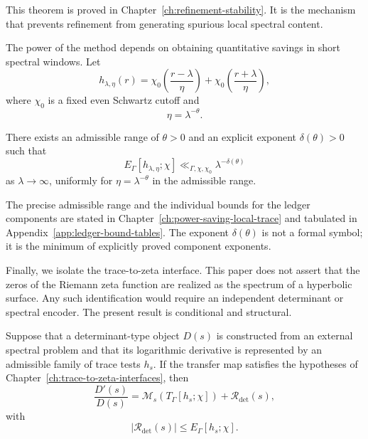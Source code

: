 This theorem is proved in Chapter~\ref{ch:refinement-stability}.  It is the mechanism that prevents refinement from generating spurious local spectral content.

The power of the method depends on obtaining quantitative savings in short spectral windows.  Let
\begin{equation}
  h_{\lambda,\eta}(r)
  =
  \chi_0\left(\frac{r-\lambda}{\eta}\right)
  +
  \chi_0\left(\frac{r+\lambda}{\eta}\right),
  \label{eq:intro-window-multiplier}
\end{equation}
where \(\chi_0\) is a fixed even Schwartz cutoff and
\begin{equation}
  \eta=\lambda^{-\theta}.
  \label{eq:intro-window-width}
\end{equation}

\begin{theorem}
\label{thm:intro-power-saving}
There exists an admissible range of \(\theta>0\) and an explicit exponent \(\delta(\theta)>0\) such that
\begin{equation}
  E_\Gamma[h_{\lambda,\eta};\chi]
  \ll_{\Gamma,\chi,\chi_0}
  \lambda^{-\delta(\theta)}
  \label{eq:intro-power-saving-ledger}
\end{equation}
as \(\lambda\to\infty\), uniformly for \(\eta=\lambda^{-\theta}\) in the admissible range.
\end{theorem}

The precise admissible range and the individual bounds for the ledger components are stated in Chapter~\ref{ch:power-saving-local-trace} and tabulated in Appendix~\ref{app:ledger-bound-tables}.  The exponent \(\delta(\theta)\) is not a formal symbol; it is the minimum of explicitly proved component exponents.

Finally, we isolate the trace-to-zeta interface.  This paper does not assert that the zeros of the Riemann zeta function are realized as the spectrum of a hyperbolic surface.  Any such identification would require an independent determinant or spectral encoder.  The present result is conditional and structural.

\begin{theorem}
\label{thm:intro-trace-to-determinant}
Suppose that a determinant-type object \(D(s)\) is constructed from an external spectral problem and that its logarithmic derivative is represented by an admissible family of trace tests \(h_s\).  If the transfer map satisfies the hypotheses of Chapter~\ref{ch:trace-to-zeta-interfaces}, then
\begin{equation}
  \frac{D'(s)}{D(s)}
  =
  \mathcal M_s\!\left(T_\Gamma[h_s;\chi]\right)
  +
  \mathcal R_{\mathrm{det}}(s),
  \label{eq:intro-determinant-transfer}
\end{equation}
with
\begin{equation}
  |\mathcal R_{\mathrm{det}}(s)|
  \le
  E_\Gamma[h_s;\chi].
  \label{eq:intro-determinant-transfer-bound}
\end{equation}
\end{theorem}

